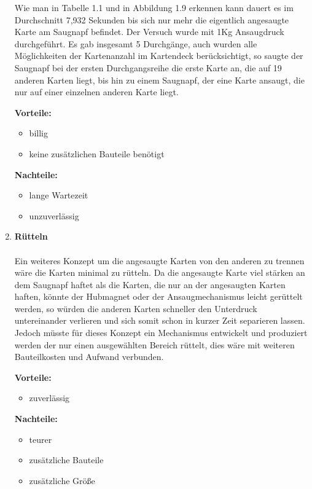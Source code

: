 \begin{enumerate}
    Wie man in Tabelle 1.1 und in Abbildung 1.9 erkennen kann dauert es im Durchschnitt 7,932 Sekunden bis sich nur mehr die
    eigentlich angesaugte Karte am Saugnapf befindet. Der Versuch wurde mit 1Kg Ansaugdruck durchgeführt. Es gab insgesamt
    5 Durchgänge, auch wurden alle Möglichkeiten der Kartenanzahl im Kartendeck berücksichtigt, so saugte der Saugnapf
    bei der ersten Durchgangsreihe die erste Karte an, die auf 19 anderen Karten liegt, bis hin zu einem Saugnapf, der
    eine Karte ansaugt, die nur auf einer einzelnen anderen Karte liegt.

    \textbf{Vorteile:}
    \begin{itemize}
        \item billig
        \item keine zusätzlichen Bauteile benötigt
    \end{itemize}
    \textbf{Nachteile:}
    \begin{itemize}
        \item lange Wartezeit
        \item unzuverlässig
    \end{itemize}

    \item \textbf{Rütteln}\\\\
Ein weiteres Konzept um die angesaugte Karten von den anderen zu trennen wäre die Karten minimal zu rütteln.
Da die angesaugte Karte viel stärken an dem Saugnapf haftet als die Karten, die nur an der angesaugten Karten haften,
könnte der Hubmagnet oder der Ansaugmechanismus leicht gerüttelt werden, so würden die anderen Karten schneller den
Unterdruck untereinander verlieren und sich somit schon in kurzer Zeit separieren lassen. Jedoch müsste für dieses Konzept
ein Mechanismus entwickelt und produziert werden der nur einen ausgewählten Bereich rüttelt, dies wäre mit weiteren Bauteilkosten und
Aufwand verbunden.

\textbf{Vorteile:}
\begin{itemize}
    \item zuverlässig
\end{itemize}
\textbf{Nachteile:}
\begin{itemize}
    \item teurer
    \item zusätzliche Bauteile
    \item zusätzliche Größe
\end{itemize}




\end{enumerate}
